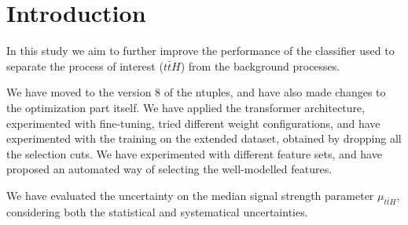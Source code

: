 \section{Introduction}

In this study we aim to further improve the performance of the classifier used to separate the process of interest
($t\bar{t}H$) from the background processes.

We have moved to the version 8 of the ntuples, and have also made changes to the optimization part itself. We have applied the
transformer architecture, experimented with fine-tuning, tried different weight configurations, and have experimented
with the training on the extended dataset, obtained by dropping all the selection cuts. We have experimented with
different feature sets, and have proposed an automated way of selecting the well-modelled features.

We have evaluated the uncertainty on the median signal strength parameter $\mu_{t\bar{t}H}$, considering both the
statistical and systematical uncertainties.